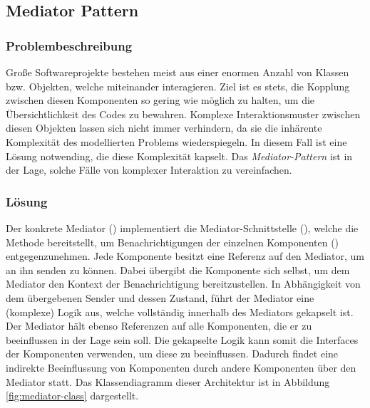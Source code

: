 \subsection{Mediator Pattern}


\subsubsection*{Problembeschreibung}

Große Softwareprojekte bestehen meist aus einer enormen Anzahl von Klassen bzw. Objekten, welche miteinander interagieren. Ziel ist es stets, die Kopplung zwischen diesen Komponenten so gering wie möglich zu halten, um die Übersichtlichkeit des Codes zu bewahren. Komplexe Interaktionsmuster zwischen diesen Objekten lassen sich nicht immer verhindern, da sie die inhärente Komplexität des modellierten Problems wiederspiegeln. In diesem Fall ist eine Lösung notwending, die diese Komplexität kapselt. Das \emph{Mediator-Pattern} ist in der Lage, solche Fälle von komplexer Interaktion zu vereinfachen. \cite{gamma_design_1995}

\subsubsection*{Lösung}

Der konkrete Mediator () implementiert die Mediator-Schnittstelle (), welche die Methode  bereitstellt, um Benachrichtigungen der einzelnen Komponenten () entgegenzunehmen. Jede Komponente besitzt eine Referenz auf den Mediator, um  an ihn senden zu können. Dabei übergibt die Komponente sich selbst, um dem Mediator den Kontext der Benachrichtigung bereitzustellen. In Abhängigkeit von dem übergebenen Sender und dessen Zustand, führt der Mediator eine (komplexe) Logik aus, welche vollständig innerhalb des Mediators gekapselt ist. Der Mediator hält ebenso Referenzen auf alle Komponenten, die er zu beeinflussen in der Lage sein soll. Die gekapselte Logik kann somit die Interfaces der Komponenten verwenden, um diese zu beeinflussen. Dadurch findet eine indirekte Beeinflussung von Komponenten durch andere Komponenten über den Mediator statt. Das Klassendiagramm dieser Architektur ist in Abbildung \ref{fig:mediator-class} dargestellt.

